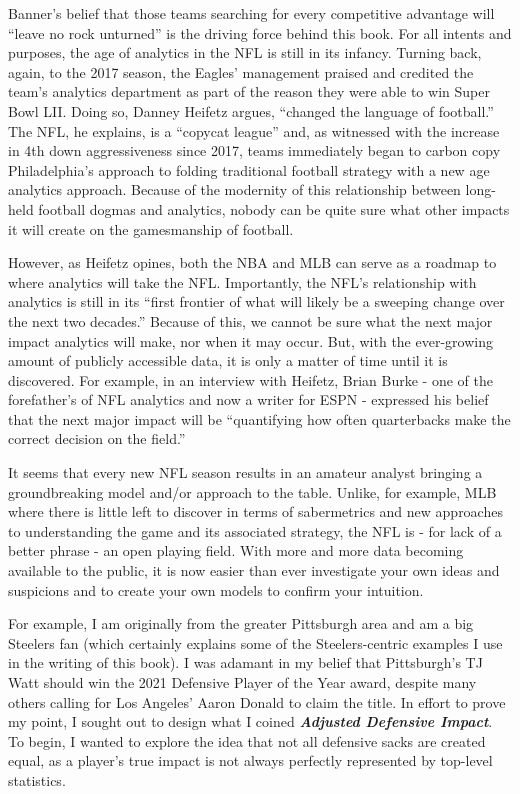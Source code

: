 \documentclass[
  letterpaper,
]{krantz}
\begin{document}
Banner's belief that those teams searching for every competitive
advantage will ``leave no rock unturned'' is the driving force behind
this book. For all intents and purposes, the age of analytics in the NFL
is still in its infancy. Turning back, again, to the 2017 season, the
Eagles' management praised and credited the team's analytics department
as part of the reason they were able to win Super Bowl LII. Doing so,
Danney Heifetz argues, ``changed the language of football.'' The NFL, he
explains, is a ``copycat league'' and, as witnessed with the increase in
4th down aggressiveness since 2017, teams immediately began to carbon
copy Philadelphia's approach to folding traditional football strategy
with a new age analytics approach. Because of the modernity of this
relationship between long-held football dogmas and analytics, nobody can
be quite sure what other impacts it will create on the gamesmanship of
football.

However, as Heifetz opines, both the NBA and MLB can serve as a roadmap
to where analytics will take the NFL. Importantly, the NFL's
relationship with analytics is still in its ``first frontier of what
will likely be a sweeping change over the next two decades.'' Because of
this, we cannot be sure what the next major impact analytics will make,
nor when it may occur. But, with the ever-growing amount of publicly
accessible data, it is only a matter of time until it is discovered. For
example, in an interview with Heifetz, Brian Burke - one of the
forefather's of NFL analytics and now a writer for ESPN - expressed his
belief that the next major impact will be ``quantifying how often
quarterbacks make the correct decision on the field.''

It seems that every new NFL season results in an amateur analyst
bringing a groundbreaking model and/or approach to the table. Unlike,
for example, MLB where there is little left to discover in terms of
sabermetrics and new approaches to understanding the game and its
associated strategy, the NFL is - for lack of a better phrase - an open
playing field. With more and more data becoming available to the public,
it is now easier than ever investigate your own ideas and suspicions and
to create your own models to confirm your intuition.

For example, I am originally from the greater Pittsburgh area and am a
big Steelers fan (which certainly explains some of the Steelers-centric
examples I use in the writing of this book). I was adamant in my belief
that Pittsburgh's TJ Watt should win the 2021 Defensive Player of the
Year award, despite many others calling for Los Angeles' Aaron Donald to
claim the title. In effort to prove my point, I sought out to design
what I coined \textbf{\emph{Adjusted Defensive Impact}}. To begin, I
wanted to explore the idea that not all defensive sacks are created
equal, as a player's true impact is not always perfectly represented by
top-level statistics.
\end{document}
